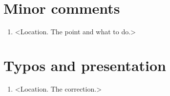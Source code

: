 \documentclass[11pt,a4paper]{article}
\begin{document}
\section*{Minor comments}

\begin{enumerate}[label=\textbf{m\arabic*.}, leftmargin=*, itemsep=0.8ex]
\item <Location. The point and what to do.>
\end{enumerate}

\section*{Typos and presentation}

\begin{enumerate}[label=\textbf{t\arabic*.}, leftmargin=*, itemsep=0.5ex]
\item <Location. The correction.>
\end{enumerate}
\end{document}
